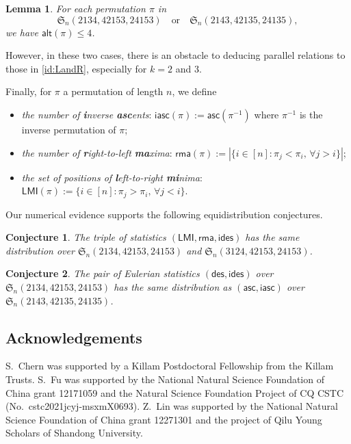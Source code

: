 \documentclass[reqno]{amsart}
\numberwithin{equation}{section}
\theoremstyle{plain}
\newtheorem{lemma}[theorem]{Lemma}
\newtheorem{conjecture}{Conjecture}[section]
\theoremstyle{definition}
\theoremstyle{named}
\newcommand{\fS}{\mathfrak{S}}
\newcommand{\asc}{\mathsf{asc}}
\newcommand{\des}{\mathsf{des}}
\newcommand{\ides}{\mathsf{ides}}
\newcommand{\alt}{\mathsf{alt}}
\newcommand{\LMI}{\mathsf{LMI}}
\newcommand{\rma}{\mathsf{rma}}
\newcommand{\iasc}{\mathsf{iasc}}
\begin{document}
\begin{lemma}
	For each permutation $\pi$ in
	$$\fS_n(2134, 42153, 24153)\quad\text{or}\quad\fS_n(2143, 42135, 24135),$$
	we have $\alt(\pi)\le 4$.
\end{lemma}

However, in these two cases, there is an obstacle to deducing parallel relations to those in \eqref{id:LandR}, especially for $k=2$ and $3$.

Finally, for $\pi$ a permutation of length $n$, we define
\begin{itemize}[leftmargin=*,align=left]
	\renewcommand{\labelitemi}{$\triangleright$}
	\item \textit{the number of \textbf{i}nverse \textbf{asc}ents}: $\iasc(\pi):=\asc(\pi^{-1})$ where $\pi^{-1}$ is the inverse permutation of $\pi$;
	
	\item \textit{the number of \textbf{r}ight-to-left \textbf{ma}xima}: $\rma(\pi):=|\{i\in[n]: \pi_j<\pi_i,\, \forall j>i\}|$; 
	
	\item \textit{the set of positions of \textbf{l}eft-to-right \textbf{mi}nima}: $\LMI(\pi):=\{i\in[n]: \pi_j>\pi_i,\, \forall j<i\}$.
\end{itemize}

Our numerical evidence supports the following equidistribution conjectures.

\begin{conjecture}
	The triple of statistics $(\LMI,\rma,\ides)$ has the same distribution over $\fS_n(2134,42153,24153)$ and $\fS_n(3124,42153,24153)$. 
\end{conjecture}

\begin{conjecture}
	The pair of Eulerian statistics $(\des,\ides)$ over  $\fS_n(2134,42153,\allowbreak 24153)$ has the same distribution as $(\asc,\iasc)$ over $\fS_n(2143,42135,24135)$. 
\end{conjecture}

\subsection*{Acknowledgements}

S.~Chern was supported by a Killam Postdoctoral Fellowship from the Killam Trusts.
S.~Fu was supported by the National Natural Science Foundation of China grant 12171059 and the Natural Science Foundation Project of CQ CSTC (No.~cstc2021jcyj-msxmX0693).
 Z.~Lin was supported by the National Natural Science Foundation of China grant 12271301 and  the project of Qilu Young Scholars of Shandong University.
\end{document}
